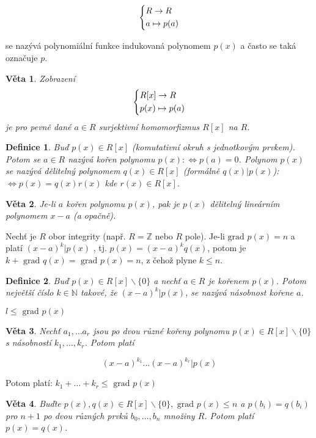 \documentclass[a4paper, 11pt]{report}
\newtheorem{mydef}{Definice}[chapter]
\newtheorem{veta}{Věta}[chapter]
\begin{document}
$$ \begin{dcases}
R \to R \\
a \mapsto p(a)
\end{dcases} $$

se nazývá polynomiální funkce indukovaná polynomem $p(x)$ a často se taká označuje $p$.

\begin{veta}
Zobrazení
$$ \begin{dcases}
R[x] \to R \\
p(x) \mapsto p(a)
\end{dcases} $$
je pro pevně dané $a \in R$ surjektivní homomorfizmus $R[x]$ na $R$.
\end{veta}

\begin{mydef}
Buď $p(x) \in R[x]$ (komutativní okruh s jednotkovým prvkem). Potom se $a \in R$ nazývá kořen polynomu $p(x): \Leftrightarrow p(a) = 0$. Polynom $p(x)$ se nazývá dělitelný polynomem $q(x) \in R[x]$ (formálně $q(x) | p(x)$): $\Leftrightarrow p(x) = q(x)r(x)$ kde $r(x) \in R[x]$.
\end{mydef}

\begin{veta}
Je-li $a$ kořen polynomu $p(x)$, pak je $p(x)$ dělitelný lineárním polynomem $x - a$ (a opačně).
\end{veta}

Nechť je $R$ obor integrity (např. $R = \mathbb{Z}$ nebo $R$ pole). Je-li $\text{grad } p(x) = n$ a platí $(x - a)^k | p(x)$ , tj. $p(x) = (x -a)^k q(x)$, potom je $k + \text{ grad } q(x) = \text{ grad } p(x) = n$, z čehož plyne $k \leq n$.

\begin{mydef}
Buď $p(x) \in R[x] \backslash \{0\}$ a nechť $a \in R$ je kořenem $p(x)$. Potom největší číslo $k \in \mathbb{N}$ takové, že $(x - a)^k | p(x)$, se nazývá násobnost kořene $a$.

$l \leq \text{ grad } p(x)$
\end{mydef}

\begin{veta}
Nechť $a_1, \dots a_r$ jsou po dvou různé kořeny polynomu $p(x) \in R[x] \backslash \{0\}$ s násobností $k_1 ,\dots, k_r$. Potom platí

$$ (x - a)^{k_1} \dots (x - a)^{k_r} | p(x)$$
\end{veta}

Potom platí: $k_1 + \dots + k_r \leq \text{ grad } p(x)$

\begin{veta}
Buďte $p(x), q(x) \in R[x] \backslash \{0\}, \text{ grad } p(x) \leq n$ a $p(b_i) = q(b_i)$ pro $n+1$ po dvou různých prvků $b_0, \dots, b_n$ množiny $R$. Potom platí $p(x) = q(x)$.
\end{veta}
\end{document}
